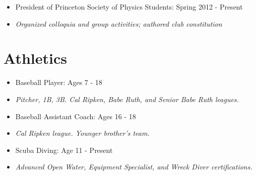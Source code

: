 \documentclass[margin]{res}
\begin{document}
\begin{resume}
\begin{itemize}
{                      students in on-location ticketing office operations}
                   \item President of Princeton Society of Physics
                     Students: Spring 2012 - Present
                   	\item[] \textit{Organized colloquia and group
                          activities; authored club constitution}
                   \end{itemize}
\normalsize{\section{Athletics}}
                   \begin{itemize}
                   \item Baseball Player: Ages 7 - 18
                   \item[] \textit{Pitcher, 1B, 3B. Cal Ripken, Babe
                     Ruth, and Senior Babe Ruth leagues.}
                   \item Baseball Assistant Coach: Ages 16 - 18
                   \item[] \textit{Cal Ripken league. Younger
                     brother's team.}
                   \item Scuba Diving: Age 11 - Present
                   \item[] \textit{Advanced Open Water, Equipment
                     Specialist, and Wreck Diver certifications.}
                   \end{itemize}

\end{resume}
\end{document}
